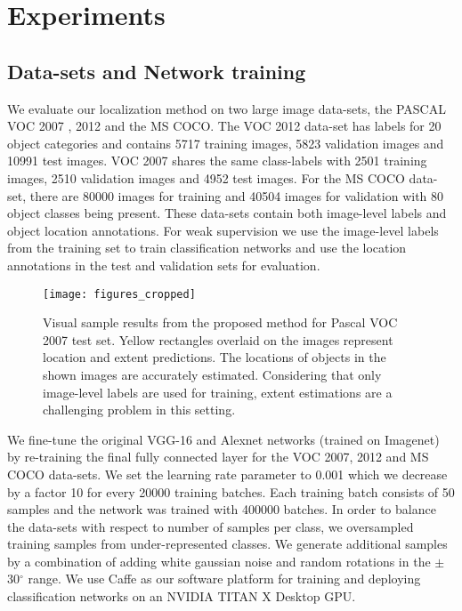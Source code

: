 \documentclass[runningheads]{llncs}
\begin{document}
\section{Experiments}\label{section:Expertiments}

\subsection{Data-sets and Network training}
We evaluate our localization method on two large image data-sets, the PASCAL VOC 2007 \cite{pascal-voc-2007}, 2012 and the MS COCO. The VOC 2012 data-set has labels for 20 object categories and contains 5717 training images, 5823 validation images and 10991 test images. VOC 2007 shares the same class-labels with 2501 training images, 2510 validation images and 4952 test images. For the MS COCO data-set, there are 80000 images for training and 40504 images for validation with 80 object classes being present. These data-sets contain both image-level labels and object location annotations. For weak supervision we use the image-level labels from the training set to train classification networks and use the location annotations in the test and validation sets for evaluation.


\begin{figure*}
\begin{center}
\texttt{[image: figures\_cropped]}
\end{center}
\caption{Visual sample results from the proposed method for Pascal VOC 2007 test set. Yellow rectangles overlaid on the images represent location and extent predictions. The locations of objects in the shown images are accurately estimated. Considering that only image-level labels are used for training, extent estimations are a challenging problem in this setting.}
\label{fig:visualresults}
\end{figure*}


We fine-tune the original VGG-16 and Alexnet networks (trained on Imagenet) by re-training the final fully connected layer for the VOC 2007, 2012 and MS COCO data-sets. We set the learning rate parameter to 0.001 which we decrease by a factor 10 for every 20000 training batches. Each training batch consists of   50 samples and the network was trained with 400000 batches. In order to balance the data-sets with respect to number of samples per class, we oversampled training samples from under-represented classes. We generate additional samples by a combination of adding white gaussian noise and random rotations in the $\pm$ 30${}^\circ$  range. We use Caffe \cite{jia2014caffe} as our software platform for training and deploying classification networks on an NVIDIA TITAN X Desktop GPU.
\end{document}
